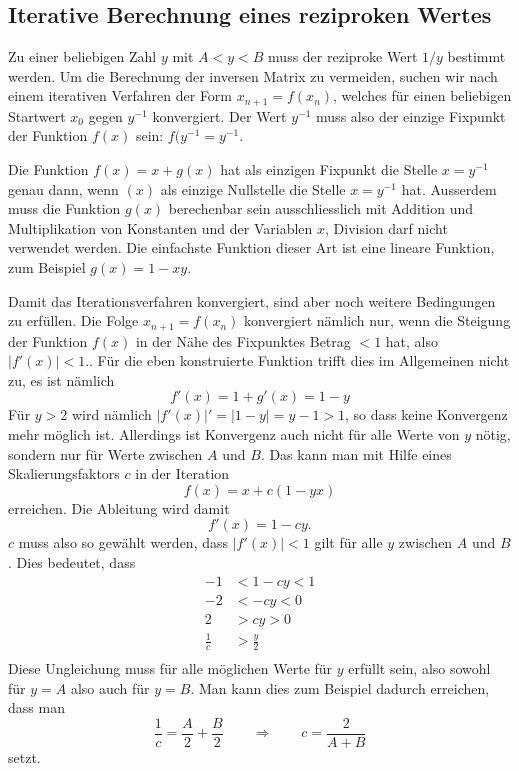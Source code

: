 %
%
%
\subsection{Iterative Berechnung eines reziproken Wertes}
Zu einer beliebigen Zahl $y$ mit $A < y < B$ muss der reziproke Wert $1/y$
bestimmt werden.
Um die Berechnung der inversen Matrix zu vermeiden, suchen wir nach einem
iterativen Verfahren der Form $x_{n+1}=f(x_n)$, welches für einen beliebigen
Startwert $x_0$ gegen $y^{-1}$ konvergiert.
Der Wert $y^{-1}$ muss also der einzige Fixpunkt der Funktion $f(x)$ sein:
$f(y^{-1}=y^{-1}$.

Die Funktion $f(x) = x + g(x)$ hat als einzigen Fixpunkt die Stelle $x=y^{-1}$
genau dann, wenn $(x)$ als einzige Nullstelle die Stelle $x=y^{-1}$ hat.
Ausserdem muss die Funktion $g(x)$ berechenbar sein ausschliesslich mit
Addition und Multiplikation von Konstanten und der Variablen $x$, Division
darf nicht verwendet werden.
Die einfachste Funktion dieser Art ist eine lineare Funktion, zum 
Beispiel $g(x) = 1- xy$.

Damit das Iterationsverfahren konvergiert, sind aber noch weitere
Bedingungen zu erfüllen.
Die Folge $x_{n+1} = f(x_n)$ konvergiert nämlich nur, wenn die Steigung
der Funktion $f(x)$ in der Nähe des Fixpunktes Betrag $<1$ hat, 
also $|f'(x)|<1$..
Für die eben konstruierte Funktion trifft dies im Allgemeinen nicht zu,
es ist nämlich
\[
f'(x) = 1 + g'(x) = 1 - y
\]
Für $y>2$ wird nämlich $|f'(x)|'=|1-y| = y-1 >1$, so dass keine Konvergenz
mehr möglich ist.
Allerdings ist Konvergenz auch nicht für alle Werte von $y$ nötig, sondern
nur für Werte zwischen $A$ und $B$.
Das kann man mit Hilfe eines Skalierungsfaktors $c$ in der Iteration
\[
f(x) = x + c(1-yx)
\]
erreichen.
Die Ableitung wird damit
\[
f'(x) = 1-cy.
\]
$c$  muss also so gewählt werden, dass $|f'(x)|<1$ gilt für alle $y$
zwischen $A$ und $B$.
Dies bedeutet, dass
\begin{align*}
-1 &< 1-cy < 1 \\
-2 &< -cy < 0 \\
2 &> cy > 0 \\
\frac1c &> \frac{y}2 \\
\end{align*}
Diese Ungleichung muss für alle möglichen Werte für $y$ erfüllt sein,
also sowohl für $y=A$ also auch für $y=B$.
Man kann dies zum Beispiel dadurch erreichen, dass man
\[
\frac1c = \frac{A}2 + \frac{B}2
\qquad\Rightarrow\qquad
c = \frac{2}{A+B}
\]
setzt.


